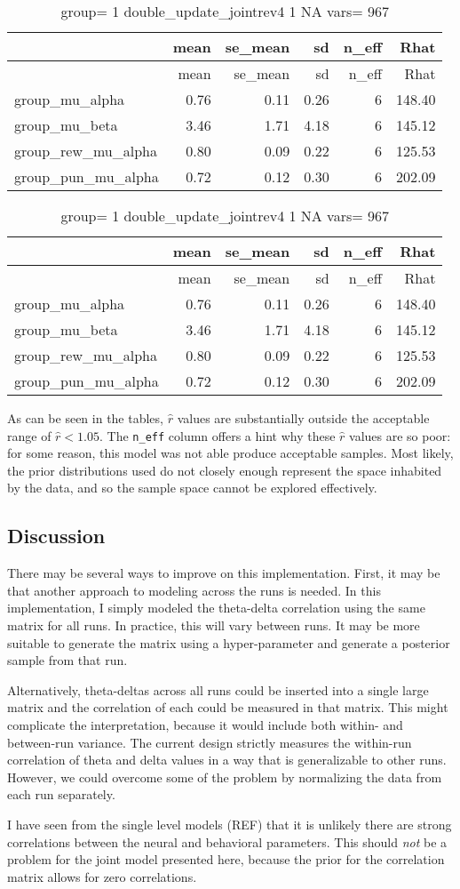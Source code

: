 \documentclass[]{article}
\begin{document}
\begin{longtable}[]{@{}lrrrrr@{}}
\caption{group= 1 double\_update\_jointrev4 1 NA vars=
967}\tabularnewline
\toprule
& mean & se\_mean & sd & n\_eff & Rhat\tabularnewline
\midrule
\endfirsthead
\toprule
& mean & se\_mean & sd & n\_eff & Rhat\tabularnewline
\midrule
\endhead
group\_mu\_alpha & 0.76 & 0.11 & 0.26 & 6 & 148.40\tabularnewline
group\_mu\_beta & 3.46 & 1.71 & 4.18 & 6 & 145.12\tabularnewline
group\_rew\_mu\_alpha & 0.80 & 0.09 & 0.22 & 6 & 125.53\tabularnewline
group\_pun\_mu\_alpha & 0.72 & 0.12 & 0.30 & 6 & 202.09\tabularnewline
\bottomrule
\end{longtable}

\begin{longtable}[]{@{}lrrrrr@{}}
\caption{group= 1 double\_update\_jointrev4 1 NA vars=
967}\tabularnewline
\toprule
& mean & se\_mean & sd & n\_eff & Rhat\tabularnewline
\midrule
\endfirsthead
\toprule
& mean & se\_mean & sd & n\_eff & Rhat\tabularnewline
\midrule
\endhead
group\_mu\_alpha & 0.76 & 0.11 & 0.26 & 6 & 148.40\tabularnewline
group\_mu\_beta & 3.46 & 1.71 & 4.18 & 6 & 145.12\tabularnewline
group\_rew\_mu\_alpha & 0.80 & 0.09 & 0.22 & 6 & 125.53\tabularnewline
group\_pun\_mu\_alpha & 0.72 & 0.12 & 0.30 & 6 & 202.09\tabularnewline
\bottomrule
\end{longtable}

As can be seen in the tables, \(\widehat{r}\) values are substantially
outside the acceptable range of \(\widehat{r} < 1.05\). The
\texttt{n\_eff} column offers a hint why these \(\widehat{r}\) values
are so poor: for some reason, this model was not able produce acceptable
samples. Most likely, the prior distributions used do not closely enough
represent the space inhabited by the data, and so the sample space
cannot be explored effectively.

\subsection{Discussion}\label{discussion}

There may be several ways to improve on this implementation. First, it
may be that another approach to modeling across the runs is needed. In
this implementation, I simply modeled the theta-delta correlation using
the same matrix for all runs. In practice, this will vary between runs.
It may be more suitable to generate the matrix using a hyper-parameter
and generate a posterior sample from that run.

Alternatively, theta-deltas across all runs could be inserted into a
single large matrix and the correlation of each could be measured in
that matrix. This might complicate the interpretation, because it would
include both within- and between-run variance. The current design
strictly measures the within-run correlation of theta and delta values
in a way that is generalizable to other runs. However, we could overcome
some of the problem by normalizing the data from each run separately.

I have seen from the single level models (REF) that it is unlikely there
are strong correlations between the neural and behavioral parameters.
This should \emph{not} be a problem for the joint model presented here,
because the prior for the correlation matrix allows for zero
correlations.
\end{document}
